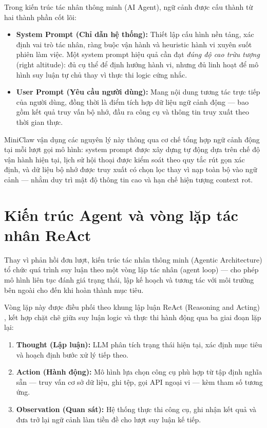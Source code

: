 Trong kiến trúc tác nhân thông minh (AI Agent), ngữ cảnh được cấu thành từ hai thành phần cốt lõi:
\begin{itemize}
  \item \textbf{System Prompt (Chỉ dẫn hệ thống):} Thiết lập cấu hình nền tảng, xác định vai trò tác nhân, ràng buộc vận hành và heuristic hành vi xuyên suốt phiên làm việc. Một system prompt hiệu quả cần đạt \textit{đúng độ cao trừu tượng} (right altitude): đủ cụ thể để định hướng hành vi, nhưng đủ linh hoạt để mô hình suy luận tự chủ thay vì thực thi logic cứng nhắc.
  \item \textbf{User Prompt (Yêu cầu người dùng):} Mang nội dung tương tác trực tiếp của người dùng, đồng thời là điểm tích hợp dữ liệu ngữ cảnh động — bao gồm kết quả truy vấn bộ nhớ, đầu ra công cụ và thông tin truy xuất theo thời gian thực.
\end{itemize}

MiniClaw vận dụng các nguyên lý này thông qua cơ chế tổng hợp ngữ cảnh động tại mỗi lượt gọi mô hình: system prompt được xây dựng tự động dựa trên chế độ vận hành hiện tại, lịch sử hội thoại được kiểm soát theo quy tắc rút gọn xác định, và dữ liệu bộ nhớ được truy xuất có chọn lọc thay vì nạp toàn bộ vào ngữ cảnh — nhằm duy trì mật độ thông tin cao và hạn chế hiện tượng context rot.

\section{Kiến trúc Agent và vòng lặp tác nhân ReAct}

Thay vì phản hồi đơn lượt, kiến trúc tác nhân thông minh (Agentic Architecture) tổ chức quá trình suy luận theo một vòng lặp tác nhân (agent loop) — cho phép mô hình liên tục đánh giá trạng thái, lập kế hoạch và tương tác với môi trường bên ngoài cho đến khi hoàn thành mục tiêu.

Vòng lặp này được điều phối theo khung lập luận ReAct (Reasoning and Acting) \cite{yao2022react}, kết hợp chặt chẽ giữa suy luận logic và thực thi hành động qua ba giai đoạn lặp lại:
\begin{enumerate}
  \item \textbf{Thought (Lập luận):} LLM phân tích trạng thái hiện tại, xác định mục tiêu và hoạch định bước xử lý tiếp theo.
  \item \textbf{Action (Hành động):} Mô hình lựa chọn công cụ phù hợp từ tập định nghĩa sẵn — truy vấn cơ sở dữ liệu, ghi tệp, gọi API ngoại vi — kèm tham số tương ứng.
  \item \textbf{Observation (Quan sát):} Hệ thống thực thi công cụ, ghi nhận kết quả và đưa trở lại ngữ cảnh làm tiền đề cho lượt suy luận kế tiếp.
\end{enumerate}

